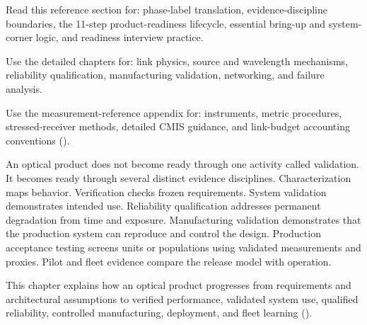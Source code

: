 

Read this reference section for: phase-label translation, evidence-discipline
boundaries, the 11-step product-readiness lifecycle, essential bring-up and
system-corner logic, and readiness interview practice.

Use the detailed chapters for: link physics, source and wavelength mechanisms,
reliability qualification, manufacturing validation, networking, and failure
analysis.

Use the measurement-reference appendix for: instruments, metric procedures,
stressed-receiver methods, detailed CMIS guidance, and link-budget accounting
conventions
().

An optical product does not become ready through one activity called validation.
It becomes ready through several distinct evidence disciplines.
Characterization maps behavior. Verification checks frozen requirements.
System validation demonstrates intended use. Reliability qualification
addresses permanent degradation from time and exposure. Manufacturing
validation demonstrates that the production system can reproduce and control
the design. Production acceptance testing screens units or populations using
validated measurements and proxies. Pilot and fleet evidence compare the
release model with operation.

This chapter explains how an optical product progresses from requirements and
architectural assumptions to verified performance, validated system use,
qualified reliability, controlled manufacturing, deployment, and fleet
learning
().


